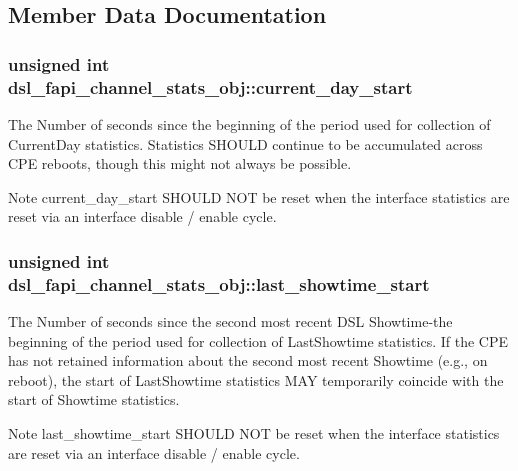 \subsection{Member Data Documentation}
\hypertarget{structdsl__fapi__channel__stats__obj_a92ac5b795668274a880a3f2e71cf3f99}{
\subsubsection[{current\-\_\-day\-\_\-start}]{\setlength{\rightskip}{0pt plus 5cm}unsigned int dsl\-\_\-fapi\-\_\-channel\-\_\-stats\-\_\-obj\-::current\-\_\-day\-\_\-start}}\label{structdsl__fapi__channel__stats__obj_a92ac5b795668274a880a3f2e71cf3f99}
The Number of seconds since the beginning of the period used for collection of Current\-Day statistics. Statistics S\-H\-O\-U\-L\-D continue to be accumulated across C\-P\-E reboots, though this might not always be possible. \begin{DoxyNote}{Note}
current\-\_\-day\-\_\-start S\-H\-O\-U\-L\-D N\-O\-T be reset when the interface statistics are reset via an interface disable / enable cycle. 
\end{DoxyNote}
\hypertarget{structdsl__fapi__channel__stats__obj_a7ebc0d2400a363971384bca8c17ac803}{
\subsubsection[{last\-\_\-showtime\-\_\-start}]{\setlength{\rightskip}{0pt plus 5cm}unsigned int dsl\-\_\-fapi\-\_\-channel\-\_\-stats\-\_\-obj\-::last\-\_\-showtime\-\_\-start}}\label{structdsl__fapi__channel__stats__obj_a7ebc0d2400a363971384bca8c17ac803}
The Number of seconds since the second most recent D\-S\-L Showtime-\/the beginning of the period used for collection of Last\-Showtime statistics. If the C\-P\-E has not retained information about the second most recent Showtime (e.\-g., on reboot), the start of Last\-Showtime statistics M\-A\-Y temporarily coincide with the start of Showtime statistics. \begin{DoxyNote}{Note}
last\-\_\-showtime\-\_\-start S\-H\-O\-U\-L\-D N\-O\-T be reset when the interface statistics are reset via an interface disable / enable cycle. 
\end{DoxyNote}
